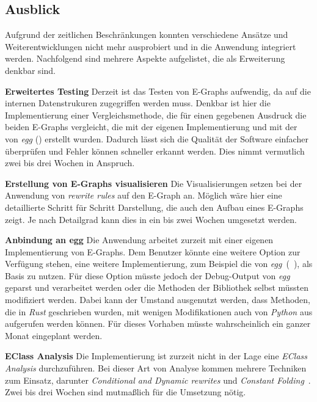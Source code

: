 \subsection{Ausblick}

Aufgrund der zeitlichen Beschränkungen konnten verschiedene Ansätze und Weiterentwicklungen nicht mehr ausprobiert und in die Anwendung integriert werden.
Nachfolgend sind mehrere Aspekte aufgelistet, die als Erweiterung denkbar sind. 

\textbf{Erweitertes Testing} Derzeit ist das Testen von E-Graphs aufwendig, da auf die internen Datenstrukuren zugegriffen werden muss.
Denkbar ist hier die Implementierung einer Vergleichsmethode, die für einen gegebenen Ausdruck die beiden E-Graphs vergleicht,
die mit der eigenen Implementierung und mit der von \textit{egg} (\cite{2021-egg}) erstellt wurden. 
Dadurch lässt sich die Qualität der Software einfacher überprüfen und Fehler können schneller erkannt werden.
Dies nimmt vermutlich zwei bis drei Wochen in Anspruch.

\textbf{Erstellung von E-Graphs visualisieren} Die Visualisierungen setzen bei der Anwendung von \textit{rewrite rules} auf den E-Graph an.
Möglich wäre hier eine detaillierte Schritt für Schritt Darstellung, die auch den Aufbau eines E-Graphs zeigt. 
Je nach Detailgrad kann dies in ein bis zwei Wochen umgesetzt werden.

\textbf{Anbindung an egg} Die Anwendung arbeitet zurzeit mit einer eigenen Implementierung von E-Graphs. Dem Benutzer könnte eine weitere Option zur Verfügung stehen, eine weitere
Implementierung, zum Beispiel die von \textit{egg}~(~\cite{2021-egg}), als Basis zu nutzen.
Für diese Option müsste jedoch der Debug-Output von \textit{egg} geparst und verarbeitet werden oder die Methoden der Bibliothek selbst müssten modifiziert werden.
Dabei kann der Umstand ausgenutzt werden, dass Methoden, die in \textit{Rust} geschrieben wurden, mit wenigen Modifikationen auch von \textit{Python} aus aufgerufen werden können.
Für dieses Vorhaben müsste wahrscheinlich ein ganzer Monat eingeplant werden.

\textbf{EClass Analysis}
Die Implementierung ist zurzeit nicht in der Lage eine \textit{EClass Analysis} durchzuführen. Bei dieser Art von Analyse kommen mehrere Techniken zum Einsatz, darunter
\textit{Conditional and Dynamic rewrites} und \textit{Constant Folding}~\cite{2021-egg}. Zwei bis drei Wochen sind mutmaßlich für die Umsetzung nötig.
